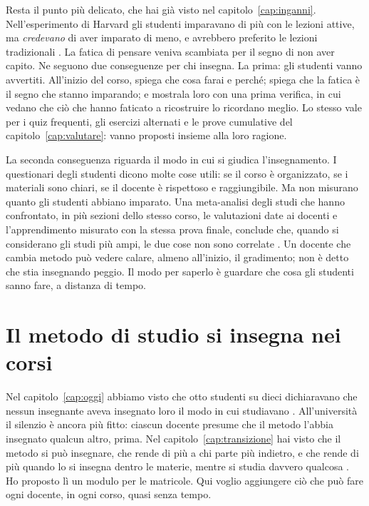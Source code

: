 Resta il punto più delicato, che hai già visto nel
capitolo~\ref{cap:inganni}. Nell'esperimento di Harvard gli studenti
imparavano di più con le lezioni attive, ma \emph{credevano} di aver
imparato di meno, e avrebbero preferito le lezioni tradizionali
\parencite{deslauriers2019}. La fatica di pensare veniva scambiata per
il segno di non aver capito. Ne seguono due conseguenze per chi
insegna. La prima: gli studenti vanno avvertiti. All'inizio del corso,
spiega che cosa farai e perché; spiega che la fatica è il segno che
stanno imparando; e mostrala loro con una prima verifica, in cui
vedano che ciò che hanno faticato a ricostruire lo ricordano meglio.
Lo stesso vale per i quiz frequenti, gli esercizi alternati e le prove
cumulative del capitolo~\ref{cap:valutare}: vanno proposti insieme
alla loro ragione.

La seconda conseguenza riguarda il modo in cui si giudica
l'insegnamento. I questionari degli studenti dicono molte cose utili:
se il corso è organizzato, se i materiali sono chiari, se il docente è
rispettoso e raggiungibile. Ma non misurano quanto gli studenti
abbiano imparato. Una meta-analisi degli studi che hanno confrontato,
in più sezioni dello stesso corso, le valutazioni date ai docenti e
l'apprendimento misurato con la stessa prova finale, conclude che,
quando si considerano gli studi più ampi, le due cose non sono
correlate \parencite{uttl2017}. Un docente che cambia metodo può
vedere calare, almeno all'inizio, il gradimento; non è detto che stia
insegnando peggio. Il modo per saperlo è guardare che cosa gli
studenti sanno fare, a distanza di tempo.

\section{Il metodo di studio si insegna nei corsi}

Nel capitolo~\ref{cap:oggi} abbiamo visto che otto studenti su dieci dichiaravano che nessun insegnante aveva insegnato loro il modo in cui studiavano \parencite{kornell2007}. All'università il silenzio è
ancora più fitto: ciascun docente presume che il metodo l'abbia
insegnato qualcun altro, prima. Nel capitolo~\ref{cap:transizione}
hai visto che il metodo si può insegnare, che rende di più a chi parte
più indietro, e che rende di più quando lo si insegna dentro le
materie, mentre si studia davvero qualcosa \parencite{eef2025}. Ho
proposto lì un modulo per le matricole. Qui voglio aggiungere ciò che
può fare ogni docente, in ogni corso, quasi senza tempo.

